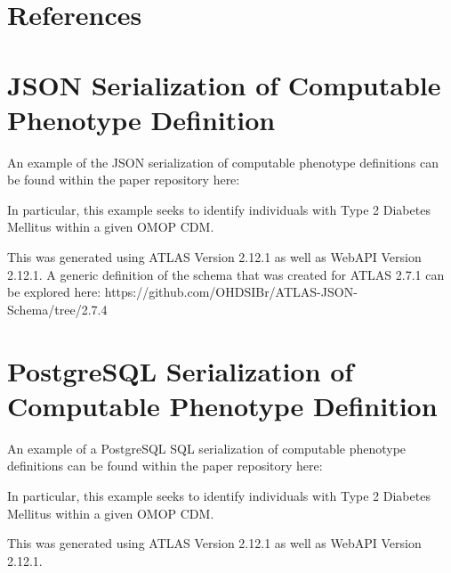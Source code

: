\documentclass{juliacon}
\begin{document}
\section{References}

\appendix

\section{JSON Serialization of Computable Phenotype Definition}\label{appendix:json}

An example of the JSON serialization of computable phenotype definitions can be found within the paper repository here:

In particular, this example seeks to identify individuals with Type 2 Diabetes Mellitus within a given OMOP CDM.

This was generated using ATLAS Version 2.12.1 as well as 
WebAPI Version 2.12.1.
A generic definition of the schema that was created for ATLAS 2.7.1 can be explored here: https://github.com/OHDSIBr/ATLAS-JSON-Schema/tree/2.7.4

\section{PostgreSQL Serialization of Computable Phenotype Definition}\label{appendix:postgresql}

An example of a PostgreSQL SQL serialization of computable phenotype definitions can be found within the paper repository here:

In particular, this example seeks to identify individuals with Type 2 Diabetes Mellitus within a given OMOP CDM.

This was generated using ATLAS Version 2.12.1 as well as 
WebAPI Version 2.12.1.


\end{document}
